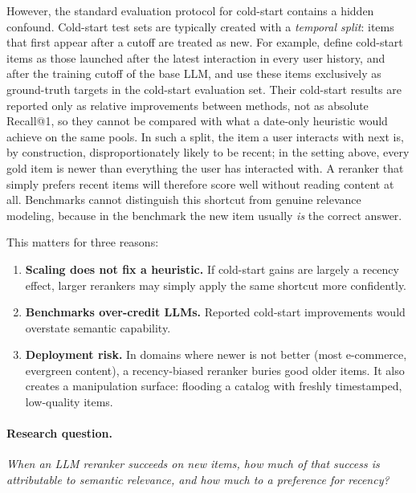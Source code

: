 \documentclass[11pt]{article}
\begin{document}
However, the standard evaluation protocol for cold-start contains a hidden confound. Cold-start test sets are typically created with a \emph{temporal split}: items that first appear after a cutoff are treated as new. For example, \citet{li2026llmreasoning} define cold-start items as those launched after the latest interaction in every user history, and after the training cutoff of the base LLM, and use these items exclusively as ground-truth targets in the cold-start evaluation set. Their cold-start results are reported only as relative improvements between methods, not as absolute Recall@1, so they cannot be compared with what a date-only heuristic would achieve on the same pools. In such a split, the item a user interacts with next is, by construction, disproportionately likely to be recent; in the setting above, every gold item is newer than everything the user has interacted with. A reranker that simply prefers recent items will therefore score well without reading content at all. Benchmarks cannot distinguish this shortcut from genuine relevance modeling, because in the benchmark the new item usually \emph{is} the correct answer.

This matters for three reasons:
\begin{enumerate}
  \item \textbf{Scaling does not fix a heuristic.} If cold-start gains are largely a recency effect, larger rerankers may simply apply the same shortcut more confidently.
  \item \textbf{Benchmarks over-credit LLMs.} Reported cold-start improvements would overstate semantic capability.
  \item \textbf{Deployment risk.} In domains where newer is not better (most e-commerce, evergreen content), a recency-biased reranker buries good older items. It also creates a manipulation surface: flooding a catalog with freshly timestamped, low-quality items.
\end{enumerate}

\paragraph{Research question.} \emph{When an LLM reranker succeeds on new items, how much of that success is attributable to semantic relevance, and how much to a preference for recency?}
\end{document}
